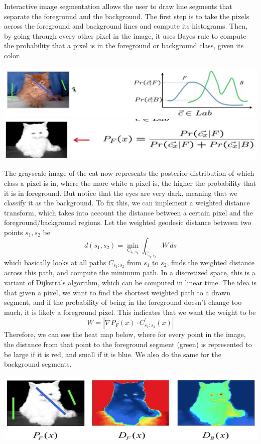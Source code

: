 \documentclass{article}
\begin{document}
    Interactive image segmentation allows the user to draw line segments that separate the foreground and the background. The first step is to take the pixels across the foreground and background lines and compute its histograms. Then, by going through every other pixel in the image, it uses Bayes rule to compute the probability that a pixel is in the foreground or background class, given its color. 
    \begin{center}
        \includegraphics[scale=0.3]{img/cat1.png}
        \includegraphics[scale=0.3]{img/cat2.png}
    \end{center}
    The grayscale image of the cat now represents the posterior distribution of which class a pixel is in, where the more white a pixel is, the higher the probability that it is in foreground. But notice that the eyes are very dark, meaning that we classify it as the background. To fix this, we can implement a weighted distance transform, which takes into account the distance between a certain pixel and the foreground/background regions. Let the weighted geodesic distance between two points $s_1, s_2$ be 
    \[d(s_1, s_2) = \min_{C_{s_1 : s_2}} \int_{C_{s_1 : s_2}} W \,ds \]
    which basically looks at all paths $C_{s_1:s_2}$ from $s_1$ to $s_2$, finds the weighted distance across this path, and compute the minimum path. In a discretized space, this is a variant of Dijkstra's algorithm, which can be computed in linear time. The idea is that given a pixel, we want to find the shortest weighted path to a drawn segment, and if the probability of being in the foreground doesn't change too much, it is likely a foreground pixel. This indicates that we want the weight to be 
    \[W = | \nabla P_F (x) \cdot C^\prime_{s_1 : s_2} (x)|\]
    Therefore, we can see the heat map below, where for every point in the image, the distance from that point to the foreground segment (green) is represented to be large if it is red, and small if it is blue. We also do the same for the background segments.
    \begin{center}
        \includegraphics[scale=0.35]{img/cat3.png}
    \end{center}
\end{document}
